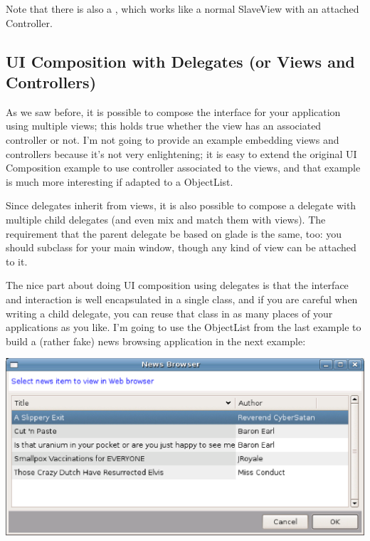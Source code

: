 \documentclass[a4paper]{howto}
\begin{document}
Note that there is also a , which works like a
normal SlaveView with an attached Controller.

\subsection{UI Composition with Delegates (or Views and Controllers)}

As we saw before, it is possible to compose the interface for your
application using multiple views; this holds true whether the view has
an associated controller or not. I'm not going to provide an example
embedding views and controllers because it's not very enlightening; it
is easy to extend the original UI Composition example to use controller
associated to the views, and that example is much more interesting if
adapted to a ObjectList.

Since delegates inherit from views, it is also possible to compose
a delegate with multiple child delegates (and even mix and match them
with views). The requirement that the parent delegate be based on glade
is the same, too: you should subclass  for your
main window, though any kind of view can be attached to it.

The nice part about doing UI composition using delegates is that the
interface and interaction is well encapsulated in a single class, and if
you are careful when writing a child delegate, you can reuse that class
in as many places of your applications as you like.  I'm going to use
the ObjectList from the last example to build a (rather fake) news
browsing application in the next example:

\begin{center}
\includegraphics[scale=0.905]{images/news3.eps}
\end{center}


\end{document}
